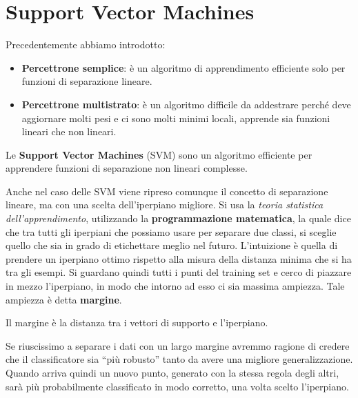 \chapter{Support Vector Machines}
Precedentemente abbiamo introdotto:
\begin{itemize}
    \item \textbf{Percettrone semplice}: è un algoritmo di apprendimento efficiente
          solo per funzioni di separazione lineare.
    \item \textbf{Percettrone multistrato}: è un algoritmo difficile da addestrare
          perché deve aggiornare molti pesi e ci sono molti minimi locali, apprende
          sia funzioni lineari che non lineari.
\end{itemize}
Le \textbf{Support Vector Machines} (SVM) sono un algoritmo efficiente per
apprendere funzioni di separazione non lineari complesse.

Anche nel caso delle SVM viene ripreso comunque il concetto di separazione lineare,
ma con una scelta dell'iperpiano migliore. Si usa la \textit{teoria statistica
    dell'apprendimento}, utilizzando la \textbf{programmazione matematica}, la quale
dice che tra tutti gli iperpiani che possiamo usare per separare due classi, si
sceglie quello che sia in grado di etichettare meglio nel futuro. L'intuizione
è quella di prendere un iperpiano ottimo rispetto alla misura della distanza minima
che si ha tra gli esempi. Si guardano quindi tutti i punti del training set e
cerco di piazzare in mezzo l'iperpiano, in modo che intorno ad esso ci sia massima
ampiezza. Tale ampiezza è detta \textbf{margine}.
\begin{definizione}
    Il margine è la distanza tra i vettori di supporto e l'iperpiano.
\end{definizione}
Se riuscissimo a separare i dati con un largo margine avremmo ragione di credere
che il classificatore sia “più robusto” tanto da avere una migliore generalizzazione.
Quando arriva quindi un nuovo punto, generato con la stessa regola degli altri,
sarà più probabilmente classificato in modo corretto, una volta scelto l'iperpiano.

